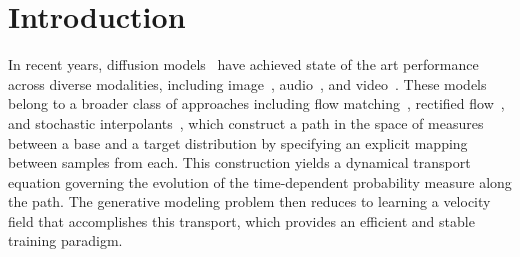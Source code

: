 \section{Introduction}
\label{sec:intro}
%
In recent years, diffusion models~\citep{song2020score, ho2020denoising, sohldickstein2015deep, song_improved_2020, song_generative_2020} have achieved state of the art performance across diverse modalities, including image~\citep{dhariwal_diffusion_2021, rombach2022high, esser_scaling_2024}, audio~\citep{popov_grad-tts_2021, jeong_diff-tts_2021, huang_prodiff_2022, lu_conditional_2022}, and video~\citep{ho_imagen_2022, ho_video_2022, blattmann_align_2023, wu_tune--video_2023}.
%
These models belong to a broader class of approaches including flow matching~\citep{lipman2022flow}, rectified flow~\citep{liu2022flow}, and stochastic interpolants~\citep{albergo2022building, albergo2023stochastic}, which construct a path in the space of measures between a base and a target distribution by specifying an explicit mapping between samples from each.
%
This construction yields a dynamical transport equation governing the evolution of the time-dependent probability measure along the path.
%
The generative modeling problem then reduces to learning a velocity field that accomplishes this transport, which provides an efficient and stable training paradigm.

